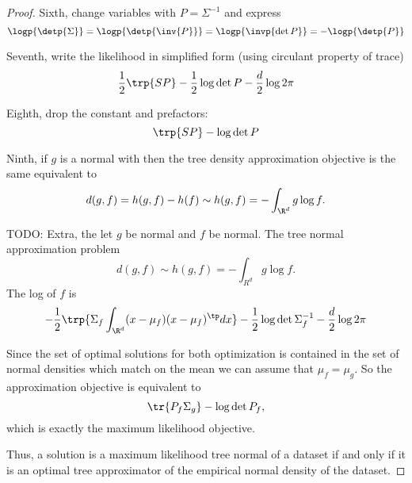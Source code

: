 \begin{prop}
\begin{proof}
Sixth, change variables with $P = \Sigma^{-1}$ and express
$$
  \logp{\detp{\Sigma}} = \logp{\detp{\inv{P}}} = \logp{\invp{\det P}} = -\logp{\detp{P}}
$$

  Seventh, write the likelihood in simplified form (using circulant property of trace)
$$
  \frac{1}{2} \trp{SP} - \frac{1}{2} \log \det P - \frac{d}{2}\log 2\pi
$$

Eighth, drop the constant and prefactors:
$$
  \trp{SP} - \log \det P
$$

Ninth, if $g$ is a normal with then the tree density approximation objective is the same equivalent to
$$
  d(g, f) = h(g, f) - h(f) \sim h(g, f) = - \int_{\R^d} g\log f.
$$

TODO:
Extra, the let $g$ be normal and $f$ be normal. The tree normal approximation problem
$$
  d(g, f) \sim h(g, f) = - \int_{R^d} g \log f.
$$
The log of $f$ is
$$
  - \frac{1}{2} \trp{ \Sigma_f \int_{\R^d} (x - \mu_f)(x - \mu_f)^{\tp} dx } - \frac{1}{2} \log \det \Sigma_f^{-1} - \frac{d}{2} \log 2\pi
$$

Since the set of optimal solutions for both optimization is contained in the set of normal densities which match on the mean we can assume that $\mu_f = \mu_g$.
So the approximation objective is equivalent to
$$
  \tr{P_f \Sigma_g} - \log \det P_f,
$$
which is exactly the maximum likelihood objective.

Thus, a solution is a maximum likelihood tree normal of a dataset if and only if it is an optimal tree approximator of the empirical normal density of the dataset.

\end{proof}

\end{prop}
